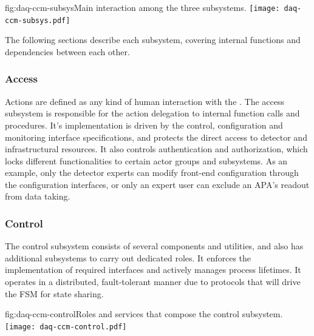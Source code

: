 \begin{dunefigure}{fig:daq-ccm-subsys}{Main interaction among the three  subsystems.}
 \texttt{[image: daq-ccm-subsys.pdf]}
\end{dunefigure}

The following sections describe each  subsystem, covering internal functions and dependencies between each other.

\subsubsection{Access}
\label{sec:daq:design:ccm:access}
Actions are defined as any kind of human interaction with the . The access subsystem is responsible for the action delegation to internal function calls and procedures. It's implementation is driven by the control, configuration and monitoring interface specifications, and protects the direct access to detector and infrastructural resources. It also controls authentication and authorization, which locks different functionalities to certain actor groups and subsystems. As an example, only the detector experts can modify front-end configuration through the configuration interfaces, or only an expert user can exclude an APA's readout from data taking. 


\subsubsection{Control}
\label{sec:daq:design:ccm:control}

The control subsystem consists of several components and utilities, and also has additional subsystems to carry out dedicated roles. It enforces the implementation of required interfaces and actively manages  process lifetimes. It operates in a distributed, fault-tolerant manner due to protocols that will drive the FSM for state sharing. 

\begin{dunefigure}{fig:daq-ccm-control}{Roles and services that compose the  control subsystem.}
  \texttt{[image: daq-ccm-control.pdf]}
\end{dunefigure}

